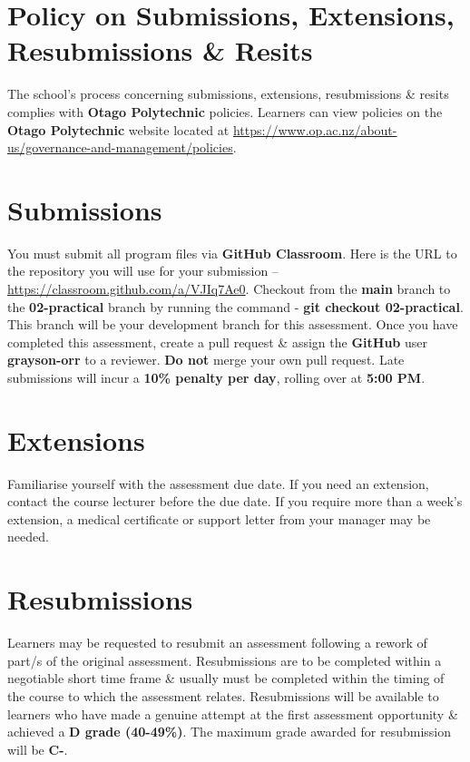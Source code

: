 \documentclass{article}
\begin{document}
\section*{Policy on Submissions, Extensions, Resubmissions \& Resits}
The school's process concerning submissions, extensions, resubmissions \& resits complies with \textbf{Otago Polytechnic} policies. Learners can view policies on the \textbf{Otago Polytechnic} website located at \href{https://www.op.ac.nz/about-us/governance-and-management/policies}{https://www.op.ac.nz/about-us/governance-and-management/policies}.

\section*{Submissions}
You must submit all program files via \textbf{GitHub Classroom}. Here is the URL to the repository you will use for your submission – \href{https://classroom.github.com/a/VJIq7Ae0}{https://classroom.github.com/a/VJIq7Ae0}. Checkout from the \textbf{main} branch to the \textbf{02-practical} branch by running the command - \textbf{git checkout 02-practical}. This branch will be your development branch for this assessment. Once you have completed this assessment, create a pull request \& assign the \textbf{GitHub} user \textbf{grayson-orr} to a reviewer. \textbf{Do not} merge your own pull request. Late submissions will incur a \textbf{10\% penalty per day}, rolling over at \textbf{5:00 PM}.

\section*{Extensions}
Familiarise yourself with the assessment due date. If you need an extension, contact the course lecturer before the due date. If you require more than a week's extension, a medical certificate or support letter from your manager may be needed.

\section*{Resubmissions}
Learners may be requested to resubmit an assessment following a rework of part/s of the original assessment. Resubmissions are to be completed within a negotiable short time frame \& usually must be completed within the timing of the course to which the assessment relates. Resubmissions will be available to learners who have made a genuine attempt at the first assessment opportunity \& achieved a \textbf{D grade (40-49\%)}. The maximum grade awarded for resubmission will be \textbf{C-}.
\end{document}
